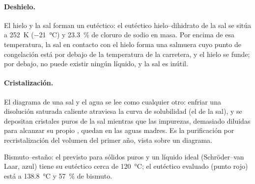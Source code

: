 \paragraph{Deshielo.} El hielo y la sal forman un eutéctico: el eutéctico hielo--dihidrato
de la sal se sitúa a \qty{252}{K} (\qty{-21}{\degreeCelsius}) y 23.3~\% de cloruro
de sodio en masa. Por encima de esa temperatura, la sal en contacto con el hielo forma una
salmuera cuyo punto de congelación está por debajo de la temperatura de la carretera, y el hielo
se funde; por debajo, no puede existir ningún líquido, y la sal es inútil.

\paragraph{Cristalización.} El diagrama de una sal y el agua se lee como cualquier
otro: enfriar una disolución saturada caliente atraviesa la curva de solubilidad (el
 de la sal), y se depositan cristales puros de la sal mientras que las
impurezas, demasiado diluidas para alcanzar su propio , quedan en las aguas madres.
Es la purificación por recristalización del volumen del primer año, vista sobre un
diagrama.

\begin{omfigure}

{\small Bismuto--estaño: el  previsto para sólidos puros y un líquido
ideal (Schröder--van Laar, azul) tiene su eutéctico cerca de
\qty{120}{\degreeCelsius}; el eutéctico evaluado (punto rojo) está a
\qty{138.8}{\degreeCelsius} y 57~\% de bismuto.}
\end{omfigure}

